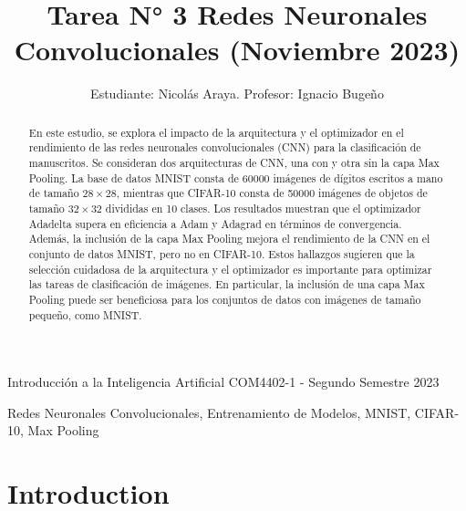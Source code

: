 \documentclass[journal]{IEEEtai}
\begin{document}
\title{Tarea N° 3 {\sc Redes Neuronales Convolucionales} (Noviembre 2023)} 


\author{Estudiante: Nicolás Araya. Profesor: Ignacio Bugeño}

{Introducción a la Inteligencia Artificial COM4402-1 - Segundo Semestre 2023}

\maketitle

\begin{abstract}
En este estudio, se explora el impacto de la arquitectura y el optimizador en el rendimiento de las redes neuronales convolucionales (CNN) para la clasificación de manuscritos. Se consideran dos arquitecturas de CNN, una con y otra sin la capa Max Pooling.
La base de datos MNIST consta de 60000 imágenes de dígitos escritos a mano de tamaño $28 \times 28$, mientras que CIFAR-10 consta de 50000 imágenes de objetos de tamaño $32 \times 32$ divididas en 10 clases.
Los resultados muestran que el optimizador Adadelta supera en eficiencia a Adam y Adagrad en términos de convergencia. Además, la inclusión de la capa Max Pooling mejora el rendimiento de la CNN en el conjunto de datos MNIST, pero no en CIFAR-10.
Estos hallazgos sugieren que la selección cuidadosa de la arquitectura y el optimizador es importante para optimizar las tareas de clasificación de imágenes. En particular, la inclusión de una capa Max Pooling puede ser beneficiosa para los conjuntos de datos con imágenes de tamaño pequeño, como MNIST.
\end{abstract}

\begin{IEEEkeywords}
Redes Neuronales Convolucionales, Entrenamiento de Modelos, MNIST, CIFAR-10, Max Pooling
\end{IEEEkeywords}

\section{Introduction}
\end{document}
